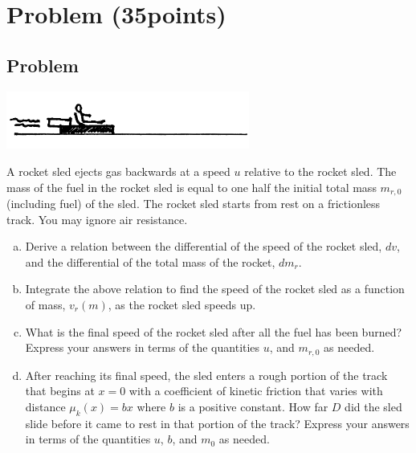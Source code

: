 \documentclass[solutions]{esg8012exam}
\begin{document}
\section{Problem \thesection\space(35\space points)}
\subsection{Problem}
  \begin{center}\includegraphics[width=0.6\textwidth]{exam2_p3_1}\end{center}
  A rocket sled ejects gas backwards at a speed $u$ relative to the rocket sled. The mass of the fuel in the rocket sled is equal to one half the initial total mass $m_{r,0}$ (including fuel) of the sled.  The rocket sled starts from rest on a frictionless track. You may ignore air resistance.
  \begin{enumerate}[(a)]
    \item Derive a relation between the differential of the speed of the rocket sled, $dv$, and the differential of the total mass of the rocket, $dm_r$.
    \item Integrate the above relation to find the speed of the rocket sled as a function of mass, $v_r(m)$, as the rocket sled speeds up.
    \item What is the final speed of the rocket sled after all the fuel has been burned?  Express your answers in terms of the quantities $u$, and $m_{r,0}$ as needed.
    \item After reaching its final speed, the sled enters a rough portion of the track that begins at $x=0$ with a coefficient of kinetic friction that varies with distance $\mu_k(x) = bx$ where $b$ is a positive constant.  How far $D$ did the sled slide before it came to rest in that portion of the track? Express your answers in terms of the quantities $u$, $b$, and $m_0$ as needed.
  \end{enumerate}
\end{document}
